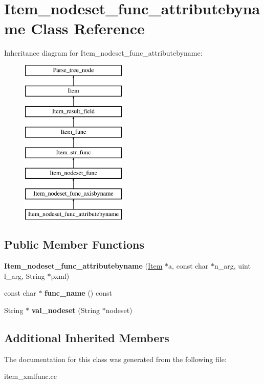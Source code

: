\hypertarget{classItem__nodeset__func__attributebyname}{}\section{Item\+\_\+nodeset\+\_\+func\+\_\+attributebyname Class Reference}
\label{classItem__nodeset__func__attributebyname}
Inheritance diagram for Item\+\_\+nodeset\+\_\+func\+\_\+attributebyname\+:\begin{figure}[H]
\begin{center}
\leavevmode
\includegraphics[height=8.000000cm]{classItem__nodeset__func__attributebyname}
\end{center}
\end{figure}
\subsection*{Public Member Functions}
\begin{DoxyCompactItemize}
\item 
\mbox{\label{classItem__nodeset__func__attributebyname_ab45eabf0d71fbc07c247d81cfee8ed0f}} 
{\bfseries Item\+\_\+nodeset\+\_\+func\+\_\+attributebyname} (\mbox{\hyperlink{classItem}{Item}} $\ast$a, const char $\ast$n\+\_\+arg, uint l\+\_\+arg, String $\ast$pxml)
\item 
\mbox{\label{classItem__nodeset__func__attributebyname_a400a3e5120666542363169e4cdbdda1c}} 
const char $\ast$ {\bfseries func\+\_\+name} () const
\item 
\mbox{\label{classItem__nodeset__func__attributebyname_ab0d574b9c553473681d4cec8f70f33ac}} 
String $\ast$ {\bfseries val\+\_\+nodeset} (String $\ast$nodeset)
\end{DoxyCompactItemize}
\subsection*{Additional Inherited Members}


The documentation for this class was generated from the following file\+:\begin{DoxyCompactItemize}
\item 
item\+\_\+xmlfunc.\+cc\end{DoxyCompactItemize}
